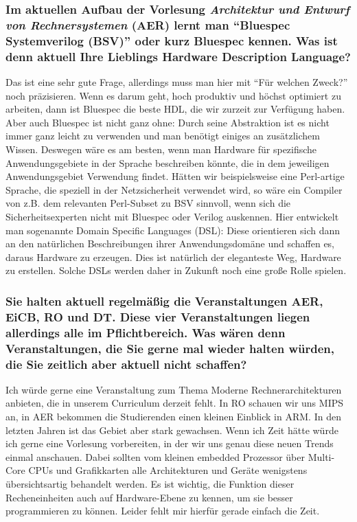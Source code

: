 {    \subsubsection{Im aktuellen Aufbau der Vorlesung \textit{Architektur und Entwurf von Rechnersystemen} (AER) lernt man "`Bluespec Systemverilog (BSV)"' oder kurz Bluespec kennen. Was ist denn aktuell Ihre Lieblings Hardware Description Language?}
    Das ist eine sehr gute Frage, allerdings muss man hier mit "`Für welchen Zweck?"' noch präzisieren. Wenn es darum geht, hoch produktiv und höchst optimiert zu arbeiten, dann ist Bluespec die beste HDL, die wir zurzeit zur Verfügung haben. Aber auch Bluespec ist nicht ganz ohne: Durch seine Abstraktion ist es nicht immer ganz leicht zu verwenden und man benötigt einiges an zusätzlichem Wissen. Deswegen wäre es am besten, wenn man Hardware für spezifische Anwendungsgebiete in der Sprache beschreiben könnte, die in dem jeweiligen Anwendungsgebiet Verwendung findet. Hätten wir beispielsweise eine Perl-artige Sprache, die speziell in der Netzsicherheit verwendet wird, so wäre ein Compiler von z.B. dem relevanten Perl-Subset zu BSV sinnvoll, wenn sich die Sicherheitsexperten nicht mit Bluespec oder Verilog auskennen. Hier entwickelt man sogenannte Domain Specific Languages (DSL): Diese orientieren sich dann an den natürlichen Beschreibungen ihrer Anwendungsdomäne und  schaffen es, daraus Hardware zu erzeugen. Dies ist natürlich der eleganteste Weg, Hardware zu erstellen. Solche DSLs werden daher in Zukunft noch eine große Rolle spielen.

    \subsubsection{Sie halten aktuell regelmäßig die Veranstaltungen AER, EiCB, RO und DT. Diese vier Veranstaltungen liegen allerdings alle im Pflichtbereich. Was wären denn Veranstaltungen, die Sie gerne mal wieder halten würden, die Sie zeitlich aber aktuell nicht schaffen?}
    Ich würde gerne eine Veranstaltung zum Thema Moderne Rechnerarchitekturen anbieten, die in unserem Curriculum derzeit fehlt. In RO schauen wir uns MIPS an, in AER bekommen die Studierenden einen kleinen Einblick in ARM. In den letzten Jahren ist das Gebiet aber stark gewachsen. Wenn ich Zeit hätte würde ich gerne eine Vorlesung vorbereiten, in der wir uns genau diese neuen Trends einmal anschauen. Dabei sollten vom kleinen embedded Prozessor über Multi-Core CPUs und Grafikkarten alle Architekturen und Geräte wenigstens übersichtsartig behandelt werden. Es ist wichtig, die Funktion dieser Recheneinheiten auch auf Hardware-Ebene zu kennen, um sie besser programmieren zu können. Leider fehlt mir hierfür gerade einfach die Zeit.

}
